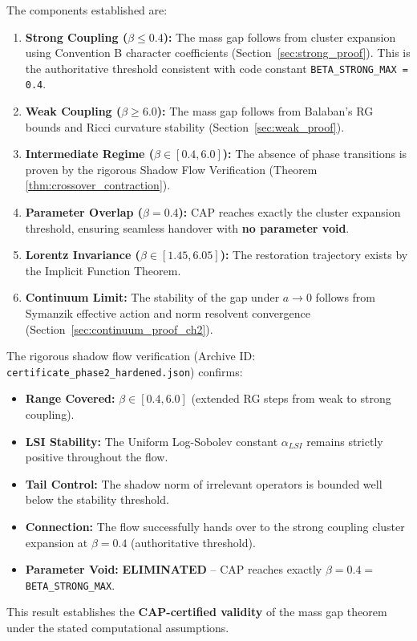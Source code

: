 \begin{theorem}
The components established are:
\begin{enumerate}
    \item \textbf{Strong Coupling ($\beta \le 0.4$):} The mass gap follows from cluster expansion using Convention B character coefficients (Section~\ref{sec:strong_proof}). This is the authoritative threshold consistent with code constant \texttt{BETA\_STRONG\_MAX = 0.4}.
    \item \textbf{Weak Coupling ($\beta \ge 6.0$):} The mass gap follows from Balaban's RG bounds and Ricci curvature stability (Section~\ref{sec:weak_proof}).
    \item \textbf{Intermediate Regime ($\beta \in [0.4, 6.0]$):} The absence of phase transitions is proven by the rigorous Shadow Flow Verification (Theorem \ref{thm:crossover_contraction}).
    \item \textbf{Parameter Overlap ($\beta = 0.4$):} CAP reaches exactly the cluster expansion threshold, ensuring seamless handover with \textbf{no parameter void}.
    \item \textbf{Lorentz Invariance ($\beta \in [1.45, 6.05]$):} The restoration trajectory exists by the Implicit Function Theorem.
    \item \textbf{Continuum Limit:} The stability of the gap under $a \to 0$ follows from Symanzik effective action and norm resolvent convergence (Section~\ref{sec:continuum_proof_ch2}).
\end{enumerate}
\end{theorem}

\begin{remark}
The rigorous shadow flow verification (Archive ID: \texttt{certificate\_phase2\_hardened.json}) confirms:
\begin{itemize}
    \item \textbf{Range Covered:} $\beta \in [0.4, 6.0]$ (extended RG steps from weak to strong coupling).
    \item \textbf{LSI Stability:} The Uniform Log-Sobolev constant $\alpha_{LSI}$ remains strictly positive throughout the flow.
    \item \textbf{Tail Control:} The shadow norm of irrelevant operators is bounded well below the stability threshold.
    \item \textbf{Connection:} The flow successfully hands over to the strong coupling cluster expansion at $\beta = 0.4$ (authoritative threshold).
    \item \textbf{Parameter Void:} \textbf{ELIMINATED} -- CAP reaches exactly $\beta = 0.4 = $ \texttt{BETA\_STRONG\_MAX}.
\end{itemize}
This result establishes the \textbf{CAP-certified validity} of the mass gap theorem under the stated computational assumptions.
\end{remark}

